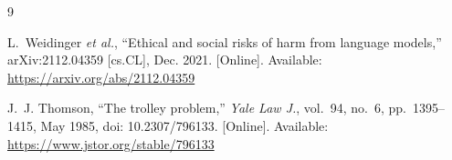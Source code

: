\documentclass[11pt,a4paper]{article}
\begin{document}
\begin{thebibliography}{9}

L.~Weidinger \emph{et al.}, ``Ethical and social risks of harm from language models,'' arXiv:2112.04359 [cs.CL], Dec. 2021. [Online]. Available: \url{https://arxiv.org/abs/2112.04359}

J.~J. Thomson, ``The trolley problem,'' \emph{Yale Law J.}, vol.~94, no.~6, pp.~1395--1415, May 1985, doi: 10.2307/796133. [Online]. Available: \url{https://www.jstor.org/stable/796133}

\end{thebibliography}
\end{document}
